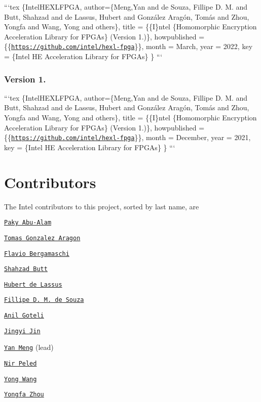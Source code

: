 ```tex \{Intel\-H\-E\-X\-L\-F\-P\-G\-A, author=\{Meng,Yan and de Souza, Fillipe D. M. and Butt, Shahzad and de Lassus, Hubert and González Aragón, Tomás and Zhou, Yongfa and Wang, Yong and others\}, title = \{\{I\}ntel \{Homomorphic Encryption Acceleration Library for F\-P\-G\-As\} (Version 1.)\}, howpublished = \{\{\href{https://github.com/intel/hexl-fpga}{\tt https\-://github.\-com/intel/hexl-\/fpga}\}\}, month = March, year = 2022, key = \{Intel H\-E Acceleration Library for F\-P\-G\-As\} \} ```

\subsubsection*{Version 1.}

```tex \{Intel\-H\-E\-X\-L\-F\-P\-G\-A, author=\{Meng,Yan and de Souza, Fillipe D. M. and Butt, Shahzad and de Lassus, Hubert and González Aragón, Tomás and Zhou, Yongfa and Wang, Yong and others\}, title = \{\{I\}ntel \{Homomorphic Encryption Acceleration Library for F\-P\-G\-As\} (Version 1.)\}, howpublished = \{\{\href{https://github.com/intel/hexl-fpga}{\tt https\-://github.\-com/intel/hexl-\/fpga}\}\}, month = December, year = 2021, key = \{Intel H\-E Acceleration Library for F\-P\-G\-As\} \} ```

\section*{Contributors}

The Intel contributors to this project, sorted by last name, are
\begin{DoxyItemize}
\item \href{https://www.linkedin.com/in/paky-abu-alam-89797710/}{\tt Paky Abu-\/\-Alam}
\item \href{https://www.linkedin.com/in/tomas-gonzalez-aragon/}{\tt Tomas Gonzalez Aragon}
\item \href{https://www.linkedin.com/in/flavio-bergamaschi-1634141/}{\tt Flavio Bergamaschi}
\item \href{https://www.linkedin.com/in/shahzad-ahmad-butt-4b44971b/}{\tt Shahzad Butt}
\item \href{https://www.linkedin.com/in/hubert-de-lassus/}{\tt Hubert de Lassus}
\item \href{https://www.linkedin.com/in/fillipe-d-m-de-souza-a8281820/}{\tt Fillipe D. M. de Souza}
\item \href{https://www.linkedin.com/in/anil-goteti}{\tt Anil Goteli}
\item \href{https://www.linkedin.com/in/jingyi-jin-655735/}{\tt Jingyi Jin}
\item \href{https://www.linkedin.com/in/yan-meng-5832895/}{\tt Yan Meng} (lead)
\item \href{https://www.linkedin.com/in/nir-peled-4a52266/}{\tt Nir Peled}
\item \href{https://github.com/wangyon1/}{\tt Yong Wang}
\item \href{https://www.linkedin.com/in/yongfa-zhou-16217166/}{\tt Yongfa Zhou}
\end{DoxyItemize}

